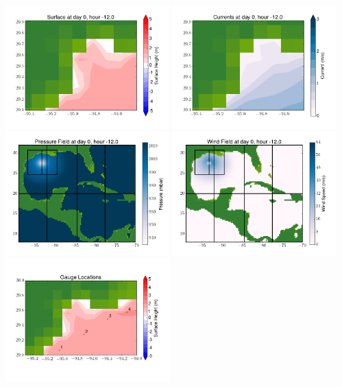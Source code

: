 \documentclass[11pt]{article}
\begin{document}
\includegraphics[width=0.475\textwidth]{frame0060fig6.png}
\vskip 10pt 
\includegraphics[width=0.475\textwidth]{frame0060fig7.png}
\includegraphics[width=0.475\textwidth]{frame0060fig8.png}
\vskip 10pt 
\includegraphics[width=0.475\textwidth]{frame0060fig9.png}
\includegraphics[width=0.475\textwidth]{frame0060fig10.png}
\end{document}
